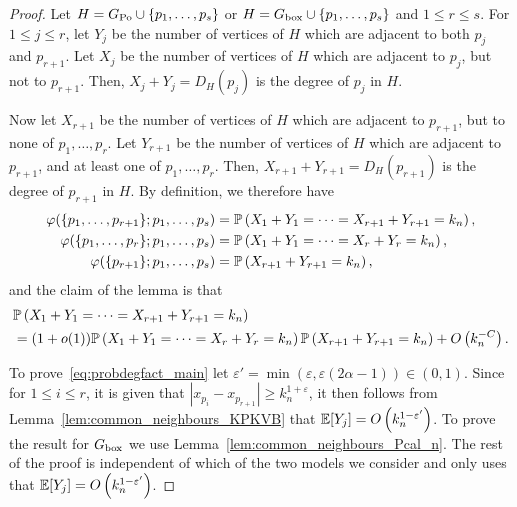 \begin{proof}
Let $H=G_{{\mathrm{Po}}} \cup\{p_1,\dots,p_s\}$ or $H=G_{\mathrm{box}} \cup \{p_1,\dots,p_s\}$ and $1\leq r\leq s$. For $1\leq j \leq r$, let $Y_j$ be the number of vertices of $H$ which are adjacent to both $p_j$ and $p_{r+1}$. Let $X_j$ be the number of vertices of $H$ which are adjacent to $p_j$, but not to $p_{r+1}$. Then, $X_j+Y_j= D_{H}(p_j)$ is the degree of $p_j$ in $H$. 

Now let $X_{r+1}$ be the number of vertices of $H$ which are adjacent to $p_{r+1}$, but to none of $p_1,\dots,p_r$. Let $Y_{r+1}$ be the number of vertices of $H$ which are adjacent to $p_{r+1}$, and at least one of $p_1,\dots,p_r$. Then, $X_{r+1}+Y_{r+1}=D_H(p_{r+1})$ is the degree of $p_{r+1}$ in $H$. By definition, we therefore have
\begin{align*}
\varphi(\{p_1,\dots,p_{r+1}\};p_1,\dots,p_s)&=\mathbb{P}\left(X_1+Y_1=\dots=X_{r+1}+Y_{r+1}=k_n\right), \\
\varphi(\{p_1,\dots,p_r\};p_1,\dots,p_s)&=\mathbb{P}\left(X_1+Y_1=\dots=X_r+Y_r=k_n\right), \\
\varphi(\{p_{r+1}\};p_1,\dots,p_s)&=\mathbb{P}\left(X_{r+1}+Y_{r+1}=k_n\right),
\end{align*}
and the claim of the lemma is that
\begin{equation}\label{eq:probdegfact_main}
	\begin{aligned}
		&\mathbb{P}\left(X_1+Y_1=\dots=X_{r+1}+Y_{r+1}=k_n\right) \\
		&= (1+o(1))\mathbb{P}\left(X_1+Y_1=\dots=X_r+Y_r=k_n\right)\mathbb{P}\left(X_{r+1}+Y_{r+1}=k_n\right)+O\left(k_n^{-C}\right).
	\end{aligned}
\end{equation}

To prove~\eqref{eq:probdegfact_main} let $\varepsilon'=\min(\varepsilon,\varepsilon(2\alpha-1))\in (0,1)$. Since for $1\leq i \leq r$, it is given that $|x_{p_i}-x_{p_{r+1}}|\geq k_n^{1+\varepsilon}$, it then follows from Lemma~\ref{lem:common_neighbours_KPKVB} that $\mathbb{E}[Y_j] = O\left(k_n^{1-\varepsilon'}\right)$. To prove the result for $G_{\mathrm{box}}$ we use Lemma~\ref{lem:common_neighbours_Pcal_n}. The rest of the proof is independent of which of the two models we consider and only uses that $\mathbb{E}[Y_j] = O\left(k_n^{1-\varepsilon'}\right)$.


\end{proof}
